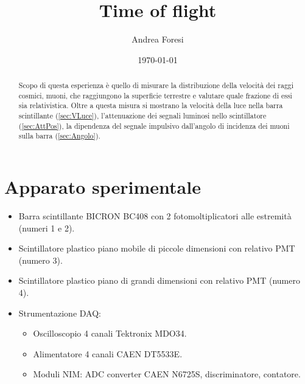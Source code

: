 \documentclass[a4paper,twocolumn]{article}
\title{Time of flight}
\author{Andrea Foresi}
\date{\today}
\begin{document}
\maketitle

\begin{abstract}
Scopo di questa esperienza è quello di misurare la distribuzione della velocità dei raggi cosmici, muoni, che raggiungono la superficie terrestre e valutare quale frazione di essi sia relativistica. Oltre a questa misura si mostrano la velocità della luce nella barra scintillante (\ref{sec:VLuce}), l'attenuazione dei segnali luminosi nello scintillatore (\ref{sec:AttPos}), la dipendenza del segnale impulsivo dall'angolo di incidenza dei muoni sulla barra (\ref{sec:Angolo}).
\end{abstract}

\tableofcontents


\section{Apparato sperimentale}
\label{sec:AppSper}
\begin{itemize}
\item Barra scintillante BICRON BC408 con 2 fotomoltiplicatori alle estremità (numeri 1 e 2).
\item Scintillatore plastico piano mobile di piccole dimensioni con relativo PMT (numero 3).
\item Scintillatore plastico piano di grandi dimensioni con relativo PMT (numero 4).
\item Strumentazione DAQ:
\begin{itemize}
\item Oscilloscopio 4 canali Tektronix MDO34.
\item Alimentatore 4 canali CAEN DT5533E.
\item Moduli NIM: ADC converter CAEN N6725S, discriminatore, contatore.
\end{itemize}
\end{itemize}
\end{document}
